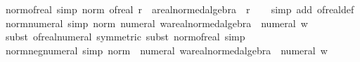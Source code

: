 \begin{isabellebody}
\endisatagproof
{\isafoldproof}%
%
\isadelimproof
\isanewline
%
\endisadelimproof
\isanewline
{}\isamarkupfalse%
\ norm{\isacharunderscore}{\kern0pt}of{\isacharunderscore}{\kern0pt}real\ {\isacharbrackleft}{\kern0pt}simp{\isacharbrackright}{\kern0pt}{\isacharcolon}{\kern0pt}\ {\isachardoublequoteopen}norm\ {\isacharparenleft}{\kern0pt}of{\isacharunderscore}{\kern0pt}real\ r\ {\isacharcolon}{\kern0pt}{\isacharcolon}{\kern0pt}\ {\isacharprime}{\kern0pt}a{\isacharcolon}{\kern0pt}{\isacharcolon}{\kern0pt}real{\isacharunderscore}{\kern0pt}normed{\isacharunderscore}{\kern0pt}algebra{\isacharunderscore}{\kern0pt}{}{\isacharparenright}{\kern0pt}\ {\isacharequal}{\kern0pt}\ {\isasymbar}r{\isasymbar}{\isachardoublequoteclose}\isanewline
%
\isadelimproof
\ \ %
\endisadelimproof
%
\isatagproof
{}\isamarkupfalse%
\ {\isacharparenleft}{\kern0pt}simp\ add{\isacharcolon}{\kern0pt}\ of{\isacharunderscore}{\kern0pt}real{\isacharunderscore}{\kern0pt}def{\isacharparenright}{\kern0pt}%
\endisatagproof
{\isafoldproof}%
%
\isadelimproof
\isanewline
%
\endisadelimproof
\isanewline
{}\isamarkupfalse%
\ norm{\isacharunderscore}{\kern0pt}numeral\ {\isacharbrackleft}{\kern0pt}simp{\isacharbrackright}{\kern0pt}{\isacharcolon}{\kern0pt}\ {\isachardoublequoteopen}norm\ {\isacharparenleft}{\kern0pt}numeral\ w{\isacharcolon}{\kern0pt}{\isacharcolon}{\kern0pt}{\isacharprime}{\kern0pt}a{\isacharcolon}{\kern0pt}{\isacharcolon}{\kern0pt}real{\isacharunderscore}{\kern0pt}normed{\isacharunderscore}{\kern0pt}algebra{\isacharunderscore}{\kern0pt}{}{\isacharparenright}{\kern0pt}\ {\isacharequal}{\kern0pt}\ numeral\ w{\isachardoublequoteclose}\isanewline
%
\isadelimproof
\ \ %
\endisadelimproof
%
\isatagproof
{}\isamarkupfalse%
\ {\isacharparenleft}{\kern0pt}subst\ of{\isacharunderscore}{\kern0pt}real{\isacharunderscore}{\kern0pt}numeral\ {\isacharbrackleft}{\kern0pt}symmetric{\isacharbrackright}{\kern0pt}{\isacharcomma}{\kern0pt}\ subst\ norm{\isacharunderscore}{\kern0pt}of{\isacharunderscore}{\kern0pt}real{\isacharcomma}{\kern0pt}\ simp{\isacharparenright}{\kern0pt}%
\endisatagproof
{\isafoldproof}%
%
\isadelimproof
\isanewline
%
\endisadelimproof
\isanewline
{}\isamarkupfalse%
\ norm{\isacharunderscore}{\kern0pt}neg{\isacharunderscore}{\kern0pt}numeral\ {\isacharbrackleft}{\kern0pt}simp{\isacharbrackright}{\kern0pt}{\isacharcolon}{\kern0pt}\ {\isachardoublequoteopen}norm\ {\isacharparenleft}{\kern0pt}{\isacharminus}{\kern0pt}\ numeral\ w{\isacharcolon}{\kern0pt}{\isacharcolon}{\kern0pt}{\isacharprime}{\kern0pt}a{\isacharcolon}{\kern0pt}{\isacharcolon}{\kern0pt}real{\isacharunderscore}{\kern0pt}normed{\isacharunderscore}{\kern0pt}algebra{\isacharunderscore}{\kern0pt}{}{\isacharparenright}{\kern0pt}\ {\isacharequal}{\kern0pt}\ numeral\ w{\isachardoublequoteclose}\isanewline

\end{isabellebody}
